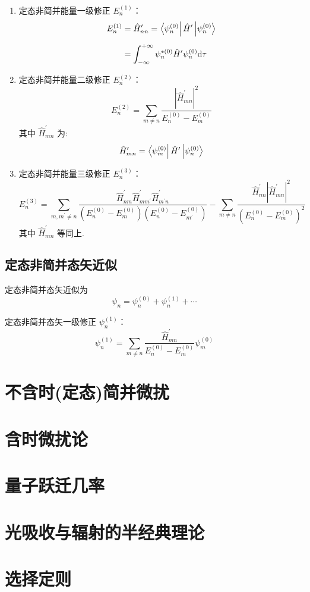 \documentclass[12pt, a4paper, oneside, UTF8]{ctexbook}
\begin{document}
\begin{enumerate}
    \item 定态非简并能量一级修正 $E_n^{(1)}$：
    \begin{equation}
        \begin{aligned}
            E_n^{(1)} &= \hat{H}_{nn}^{\prime} = \bra{\psi_n^{(0)}}{\hat{H}^{\prime}}\ket{\psi_n^{(0)}} \\[5pt]
            &= \int_{-\infty}^{+\infty} \psi_{n}^{\ast (0)}\hat{H}^{\prime}\psi_{n}^{(0)}\mathrm{d}\tau
        \end{aligned}
    \end{equation}

    \item 定态非简并能量二级修正 $E_n^{(2)}$：
    \begin{equation}
            E_n^{(2)}=\sum_{m\neq n}\frac{ \left\lvert \hat{H}_{mn}^{\prime} \right\rvert^2 }{E_n^{(0)}-E_m^{(0)}}
    \end{equation}
其中 $\hat{H}_{mn}^{\prime}$ 为:
    \begin{equation}
        \hat{H}_{mn}^{\prime} = \bra{\psi_m^{(0)}}\hat{H}^{\prime}\ket{\psi_n^{(0)}} 
    \end{equation}
    \item 定态非简并能量三级修正 $E_n^{(3)}$：
    \begin{equation}
            E_n^{(3)}=\sum_{m,m^{\prime}\neq n}\frac{\hat{H}_{nm}^{\prime}\hat{H}_{mm^{\prime}}^{\prime}\hat{H}_{m^{\prime}n}^{\prime}}{\left(E_n^{(0)}-E_m^{(0)}\right)\left(E_n^{(0)}-E_{m^{\prime}}^{(0)}\right)}-\sum_{m\neq n}\frac{\hat{H}_{nn}^{\prime} \left\lvert \hat{H}_{mn}^{\prime} \right\rvert^2 }{\left(E_n^{(0)}-E_m^{(0)}\right)^2}
    \end{equation}
其中 $\hat{H}_{mn}^{\prime}$ 等同上.

\end{enumerate}

\subsection{定态非简并态矢近似}
定态非简并态矢近似为
\begin{equation}
    \psi_n = \psi_n^{(0)}+\psi_n^{(1)}+\cdots
\end{equation}

定态非简并态矢一级修正 $\psi_n^{(1)}$：
\begin{equation}
    \psi_n^{(1)}=\sum_{m\neq n}\frac{\hat{H}_{mn}^{\prime}}{E_n^{(0)}-E_m^{(0)}}\psi_m^{(0)}
\end{equation}


\section{不含时(定态)简并微扰}
\section{含时微扰论}
\section{量子跃迁几率}
\section{光吸收与辐射的半经典理论}
\section{选择定则}


\ifx\allfiles\undefined
\end{document}
